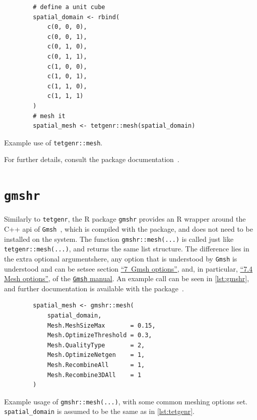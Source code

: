 \documentclass[british]{scrreprt}
\begin{document}
\begin{listing}
    \begin{verbatim}
        # define a unit cube
        spatial_domain <- rbind(
            c(0, 0, 0),
            c(0, 0, 1),
            c(0, 1, 0),
            c(0, 1, 1),
            c(1, 0, 0),
            c(1, 0, 1),
            c(1, 1, 0),
            c(1, 1, 1)
        )
        # mesh it
        spatial_mesh <- tetgenr::mesh(spatial_domain)
    \end{verbatim}
    \caption{Example use of \texttt{tetgenr::mesh}.}
    \label{lst:tetgenr}
\end{listing}
For further details, consult the package documentation~\cite{Sudwojinla3dt2022}.

\section{\texorpdfstring{\texttt{gmshr}}{gmshr}}
\label{sec:gmshr}
Similarly to \texttt{tetgenr}, the R package \texttt{gmshr} provides an R wrapper around the C++ \gls{api} of \texttt{Gmsh}~\cite{GeuzaineGmsh3Dfinite2009}, which is compiled with the package, and does not need to be installed on the system. The function \texttt{gmshr::mesh(...)} is called just like \texttt{tetgenr::mesh(...)}, and returns the same list structure. The difference lies in the extra optional arguments\textemdash{}here, any option that is understood by \texttt{Gmsh} is understood and can be set\textemdash{}see section \href{https://gmsh.info/doc/texinfo/gmsh.html#Gmsh-options}{\enquote{7\ Gmsh options}}, and, in particular, \href{https://gmsh.info/doc/texinfo/gmsh.html#Mesh-options}{\enquote{7.4 Mesh options}}, of the \href{https://gmsh.info/doc/texinfo/gmsh.html}{\texttt{Gmsh} manual}. An example call can be seen in \cref{lst:gmshr}, and further documentation is available with the package~\cite{Sudwojinla3dt2022}.
\begin{listing}
    \begin{verbatim}
        spatial_mesh <- gmshr::mesh(
            spatial_domain,
            Mesh.MeshSizeMax       = 0.15,
            Mesh.OptimizeThreshold = 0.3,
            Mesh.QualityType       = 2,
            Mesh.OptimizeNetgen    = 1,
            Mesh.RecombineAll      = 1,
            Mesh.Recombine3DAll    = 1
        )
    \end{verbatim}
    \caption{Example usage of \texttt{gmshr::mesh(...)}, with some common meshing options set. \texttt{spatial_domain} is assumed to be the same as in \cref{lst:tetgenr}.}
    \label{lst:gmshr}
\end{listing}
\end{document}
